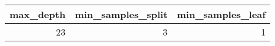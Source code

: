 \begin{tabular}{rrr}
\toprule
max_depth & min_samples_split & min_samples_leaf \\
\midrule
23 & 3 & 1 \\
\bottomrule
\end{tabular}
